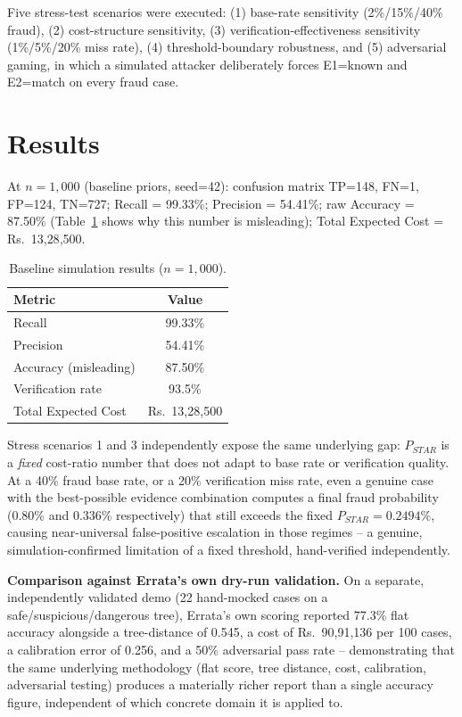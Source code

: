 \documentclass[10pt]{article}
\newcommand{\rs}{\textrm{Rs.\ }}
\begin{document}
Five stress-test scenarios were executed: (1) base-rate sensitivity
(2\%/15\%/40\% fraud), (2) cost-structure sensitivity, (3)
verification-effectiveness sensitivity (1\%/5\%/20\% miss rate), (4)
threshold-boundary robustness, and (5) adversarial gaming, in which a
simulated attacker deliberately forces E1=known and E2=match on every
fraud case.

\section{Results}

At $n=1{,}000$ (baseline priors, seed=42): confusion matrix TP=148,
FN=1, FP=124, TN=727; Recall = 99.33\%; Precision = 54.41\%; raw
Accuracy = 87.50\% (Table~\ref{tab:results} shows why this number is
misleading); Total Expected Cost = \rs 13{,}28{,}500.

\begin{table}[h]
\centering
\small
\begin{tabular}{lc}
\toprule
Metric & Value \\
\midrule
Recall & 99.33\% \\
Precision & 54.41\% \\
Accuracy (misleading) & 87.50\% \\
Verification rate & 93.5\% \\
Total Expected Cost & \rs 13,28,500 \\
\bottomrule
\end{tabular}
\caption{Baseline simulation results ($n=1{,}000$).}
\label{tab:results}
\end{table}

Stress scenarios 1 and 3 independently expose the same underlying
gap: $P_{STAR}$ is a \emph{fixed} cost-ratio number that does not
adapt to base rate or verification quality. At a 40\% fraud base rate,
or a 20\% verification miss rate, even a genuine case with the
best-possible evidence combination computes a final fraud probability
(0.80\% and 0.336\% respectively) that still exceeds the fixed
$P_{STAR}=0.2494\%$, causing near-universal false-positive escalation
in those regimes -- a genuine, simulation-confirmed limitation of a
fixed threshold, hand-verified independently.

\textbf{Comparison against Errata's own dry-run validation.} On a
separate, independently validated demo (22 hand-mocked cases on a
safe/suspicious/dangerous tree), Errata's own scoring reported 77.3\%
flat accuracy alongside a tree-distance of 0.545, a cost of
\rs 90{,}91{,}136 per 100 cases, a calibration error of 0.256, and a
50\% adversarial pass rate -- demonstrating that the same
underlying methodology (flat score, tree distance, cost, calibration,
adversarial testing) produces a materially richer report than a single
accuracy figure, independent of which concrete domain it is applied
to.
\end{document}
